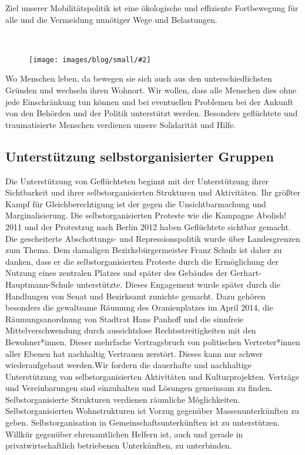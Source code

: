 \documentclass[a4paper,10pt]{article}
\newcommand{\mysection}[1]{{\vspace{1cm}\noindent\color{gray}{\ttfamily\LARGE\raggedright #1}\\\medskip}}
\newcommand{\abschnitt}[2]{%
\mysection{\raggedright #1}%
\begin{figure}[t]%
\vspace*{-2.7cm}%
\hspace*{-2.1cm}%
\texttt{[image: images/blog/small/\#2]} %
\end{figure}%
}
\begin{document}
Ziel unserer Mobilitätspolitik ist eine ökologische und effiziente
Fortbewegung für alle und die Vermeidung unnötiger Wege und Belastungen.

\clearpage
\abschnitt{Migration}{plakat_gcar}

Wo Menschen leben, da bewegen sie sich auch aus den unterschiedlichsten
Gründen und wechseln ihren Wohnort. Wir wollen, dass alle Menschen dies
ohne jede Einschränkung tun können und bei eventuellen Problemen bei der
Ankunft von den Behörden und der Politik unterstützt werden. Besonders
geflüchtete und traumatisierte Menschen verdienen unsere Solidarität und
Hilfe.

\subsection*{\ttfamily Unterstützung selbstorganisierter
Gruppen}\label{unterstuxfctzung-selbstorganisierter-gruppen}

Die Unterstützung von Geflüchteten beginnt mit der Unterstützung ihrer
Sichtbarkeit und ihrer selbstorganisierten Strukturen und Aktivitäten.
Ihr größter Kampf für Gleichberechtigung ist der gegen die
Unsichtbarmachung und Marginalisierung. Die selbstorganisierten Proteste
wie die Kampagne \mbox{Abolish!} 2011 und der Protestzug nach Berlin 2012 haben
Geflüchtete sichtbar gemacht. Die gescheiterte Ab\-schot\-tungs- und
Repressionspolitik wurde über Landesgrenzen zum Thema. Dem damaligen
Bezirksbürgermeister Franz Schulz ist daher zu danken, dass er die
selbstorganisierten Proteste durch die Ermöglichung der Nutzung eines
zentralen Platzes und später des Gebäudes der Gerhart-Hauptmann-Schule
unterstützte. Dieses Engagement wurde später durch die Handlungen von
Senat und Bezirksamt zunichte gemacht. Dazu gehören besonders die
gewaltsame Räumung des Oranienplatzes im April 2014, die
Räumungsanordnung von Stadtrat Hans Panhoff und die sinnfreie
Mittelverschwendung durch aussichtslose Rechtsstreitigkeiten mit den
Bewohner*innen. Dieser mehrfache Vertragsbruch von politischen
Vertreter*innen aller Ebenen hat nachhaltig Vertrauen zerstört. Dieses
kann nur schwer wiederaufgebaut werden.Wir fordern die dauerhafte und
nachhaltige Unterstützung von selbstorganisierten Aktivitäten und
Kulturprojekten. Verträge und Vereinbarungen sind einzuhalten und
Lösungen gemeinsam zu finden. Selbstorganisierte Strukturen verdienen
räumliche Möglichkeiten. Selbstorganisierten Wohnstrukturen ist Vorzug
gegenüber Massenunterkünften zu geben. Selbstorganisation in
Gemeinschaftsunterkünften ist zu unterstützen. Willkür gegenüber
ehrenamtlichen Helfern ist, auch und gerade in privatwirtschaftlich
betriebenen Unterkünften, zu unterbinden.
\end{document}
